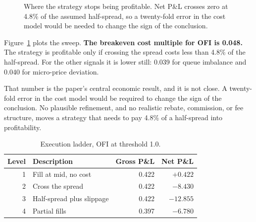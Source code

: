 \documentclass[11pt]{scrartcl}
\begin{document}
\begin{figure}[H]
\centering
{}
\caption{Where the strategy stops being profitable. Net P\&L crosses zero at 4.8\% of the assumed half-spread, so a twenty-fold error in the cost model would be needed to change the sign of the conclusion.}
\label{fig:costs}
\end{figure}

Figure~\ref{fig:costs} plots the sweep. \textbf{The breakeven cost multiple for OFI is 0.048.} The strategy is profitable only if crossing the spread costs less than 4.8\% of the half-spread. For the other signals it is lower still: 0.039 for queue imbalance and 0.040 for micro-price deviation.

That number is the paper's central economic result, and it is not close. A twenty-fold error in the cost model would be required to change the sign of the conclusion. No plausible refinement, and no realistic rebate, commission, or fee structure, moves a strategy that needs to pay 4.8\% of a half-spread into profitability.

\begin{table}[H]
\centering
\caption{Execution ladder, OFI at threshold 1.0.}
\label{tab:execution}
\begin{tabular}{rlrr}
\toprule
Level & Description & Gross P\&L & Net P\&L \\
\midrule
1 & Fill at mid, no cost        & 0.422 & $\mathbf{+0.422}$ \\
2 & Cross the spread            & 0.422 & $-8.430$ \\
3 & Half-spread plus slippage   & 0.422 & $-12.855$ \\
4 & Partial fills               & 0.397 & $-6.780$ \\
\bottomrule
\end{tabular}
\end{table}
\end{document}
